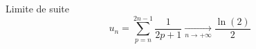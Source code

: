 \begin{Example}{}{}
Limite de suite 
\begin{equation}
  u_n = \sum_{p=n}^{2n-1} \frac{1}{2p+1}   \underset{n \to + \infty}{\longrightarrow} \frac{\ln(2)}{2} 
\end{equation}
\end{Example}












